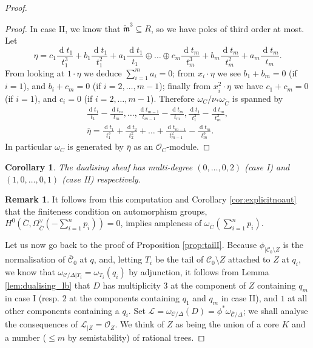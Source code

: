 \documentclass[11pt]{amsart}
\newcommand{\tm}{\widetilde{\mathfrak m}}
\newcommand{\OO}{\mathcal O}
\newcommand{\dvr}{\Delta}
\theoremstyle{plain}
\newtheorem{cor}[thm]{Corollary}
\theoremstyle{definition}
\newtheorem{rem}[thm]{Remark}
\begin{document}
\begin{proof}
\begin{proof}
In case II, we know that $\tm^3\subseteq R$, so we have poles of third order at most. Let \[\eta=c_1\frac{\operatorname{d}t_1}{t_1^3}+b_1\frac{\operatorname{d}t_1}{t_1^2}+a_1\frac{\operatorname{d}t_1}{t_1}\oplus\ldots\oplus c_m\frac{\operatorname{d}t_m}{t_m^3}+b_m\frac{\operatorname{d}t_m}{t_m^2}+a_m\frac{\operatorname{d}t_m}{t_m}.\]
 From looking at $1\cdot\eta$ we deduce $\sum_{i=1}^m a_i=0$; from $x_i\cdot\eta$ we see $b_1+b_m=0$ (if $i=1$), and $b_i+c_m=0$ (if $i=2,\ldots,m-1$); finally from $x_i^2\cdot\eta$ we have $c_1+c_m=0$ (if $i=1$), and $c_i=0$ (if $i=2,\ldots,m-1$). Therefore $\omega_C/\nu_*\omega_{\tilde C}$ is spanned by
 \begin{align*}
  \frac{\operatorname{d}t_1}{t_1}-\frac{\operatorname{d}t_m}{t_m},\ldots,\frac{\operatorname{d}t_{m-1}}{t_{m-1}}-\frac{\operatorname{d}t_m}{t_m},\frac{\operatorname{d}t_1}{t_1^2}-\frac{\operatorname{d}t_m}{t_m^2},\\
  \bar{\eta}=\frac{\operatorname{d}t_1}{t_1^3}+\frac{\operatorname{d}t_2}{t_2^2}+\ldots+\frac{\operatorname{d}t_{m-1}}{t_{m-1}^2}-\frac{\operatorname{d}t_m}{t_m^3}.
 \end{align*}
In particular $\omega_C$ is generated by $\bar{\eta}$ as an $\OO_C$-module.

\end{proof}

\begin{cor}\label{cor:deg_dualising}
 The dualising sheaf has multi-degree $(0,\ldots,0,2)$ (case I) and $(1,0,\ldots,0,1)$ (case II) respectively.
\end{cor}

\begin{rem}
 It follows from this computation and Corollary \ref{cor:explicitnoaut} that the finiteness condition on automorphism groups, $H^0(\bar C,\Omega_{\bar C}^\vee(-\sum_{i=1}^np_i))=0$, implies ampleness of $\omega_{\bar C}(\sum_{i=1}^np_i)$.
\end{rem}
Let us now go back to the proof of Proposition \ref{prop:tailI}. Because $\phi_{|\mathcal C_0\setminus Z}$ is the normalisation of $\overline{\mathcal C}_0$ at $q$, and, letting $T_i$ be the tail of $\mathcal C_0\setminus Z$ attached to $Z$ at $q_i$, we know that $\omega_{\mathcal C/\dvr|T_i}=\omega_{T_i}(q_i)$ by adjunction, it follows from Lemma \ref{lem:dualising_lb} that $D$ has multiplicity $3$ at the component of $Z$ containing $q_m$ in case I (resp. $2$ at the components containing $q_1$ and $q_m$ in case II), and $1$ at all other components containing a $q_i$. Set $\mathcal L=\omega_{\mathcal C/\dvr}(D)=\phi^*\omega_{\overline{\mathcal C}/\dvr}$; we shall analyse the consequences of $\mathcal L_{|Z}=\OO_Z$. We think of $Z$ as being the union of a core $K$ and a number ($\leq m$ by semistability) of rational trees.


\end{proof}
\end{document}
